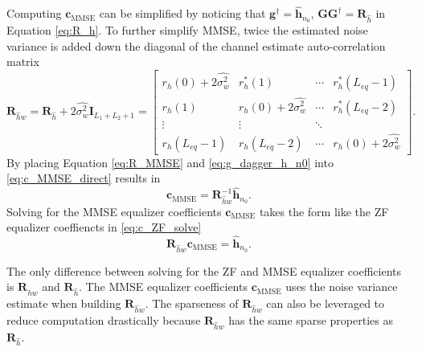 Computing $\mathbf{c}_\text{MMSE}$ can be simplified by noticing that $\mathbf{g}^\dagger = \hat{\mathbf{h}}_{n_0}$, $\mathbf{G}\mathbf{G}^\dagger = \mathbf{R}_{\hat{h}}$ in Equation \eqref{eq:R_h}.
To further simplify MMSE, twice the estimated noise variance is added down the diagonal of the channel estimate auto-correlation matrix
\begin{equation}
\mathbf{R}_{\hat{h}w} = 
\mathbf{R}_{\hat{h}} + 2\hat{\sigma^2_w} \mathbf{I}_{L_1+L_2+1} = 
		\begin{bmatrix}
		r_{h}(0) + 2\hat{\sigma^2_w}	& r^\ast_{h}(1)							& \cdots 	& r^\ast_{h}(L_{eq}-1)  	\\
		r_{h}(1) 						& r_{h}(0) + 2\hat{\sigma^2_w}& \cdots 	& r^\ast_{h}(L_{eq}-2)  				\\
		\vdots	 						& \vdots								& \ddots 	&  							\\
		r_{h}(L_{eq}-1)					& r_{h}(L_{eq}-2)						& \cdots	& r_{h}(0) + 2\hat{\sigma^2_w}  			
	\end{bmatrix}.
	\label{eq:R_MMSE}
\end{equation}
By placing Equation \eqref{eq:R_MMSE} and \eqref{eq:g_dagger_h_n0} into \eqref{eq:c_MMSE_direct} results in
\begin{equation}
\mathbf{c}_\text{MMSE} = \mathbf{R}_{\hat{h}w}^{-1} \hat{\mathbf{h}}_{n_0}.
\end{equation}
Solving for the MMSE equalizer coefficients $\mathbf{c}_\text{MMSE}$ takes the form like the ZF equalizer coeffiencts in \eqref{eq:c_ZF_solve}
\begin{equation}
\mathbf{R}_{\hat{h}w}\mathbf{c}_\text{MMSE} = \hat{\mathbf{h}}_{n_0}.
\label{eq:c_MMSE_solve}
\end{equation}

The only difference between solving for the ZF and MMSE equalizer coefficients is $\mathbf{R}_{\hat{h}w}$ and $\mathbf{R}_{\hat{h}}$. 
The MMSE equalizer coefficients $\mathbf{c}_\text{MMSE}$ uses the noise variance estimate when building $\mathbf{R}_{\hat{h}w}$.
The sparseness of $\mathbf{R}_{\hat{h}w}$ can also be leveraged to reduce computation drastically because
$\mathbf{R}_{\hat{h}w}$ has the same sparse properties as $\mathbf{R}_{\hat{h}}$.


